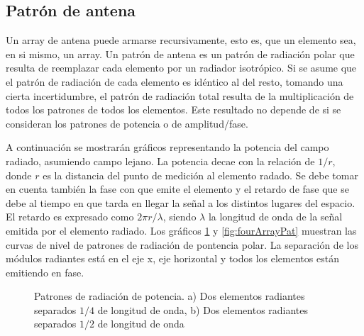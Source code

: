 \subsection{Patrón de antena}

Un array de antena puede armarse recursivamente, esto es, que un elemento sea, en si mismo, un array. Un patrón de antena es 
un patrón de radiación polar que resulta de reemplazar cada elemento por un radiador isotrópico. Si se asume que el patrón de
radiación de cada elemento es idéntico al del resto, tomando una cierta incertidumbre, el patrón de radiación total resulta de
la multiplicación de todos los patrones de todos los elementos. Este resultado no depende de si se consideran los patrones de
potencia o de amplitud/fase.

A continuación se mostrarán gráficos representando la potencia del campo radiado, asumiendo campo lejano. La potencia decae 
con la relación de $1/r$, donde $r$ es la distancia del punto de medición al elemento radado. Se debe tomar en cuenta también
la fase con que emite el elemento y el retardo de fase que se debe al tiempo en que tarda en llegar la señal a los distintos 
lugares del espacio. El retardo es expresado como $2\pi r/\lambda$, siendo $\lambda$ la longitud de onda de la señal emitida 
por el elemento radiado. Los gráficos \ref{fig:twoArrayPat} y \ref{fig:fourArrayPat} muestran las curvas de nivel de patrones 
de radiación de pontencia polar. La separación de los módulos radiantes está en el eje x, eje horizontal y todos los elementos
están emitiendo en fase.


\begin{figure}[H]
	\centering
	\caption{Patrones de radiación de potencia. a) Dos elementos radiantes separados $1/4$ de longitud de onda, b)
	Dos elementos radiantes separados $1/2$ de longitud de onda}
	\label{fig:twoArrayPat}
\end{figure}

